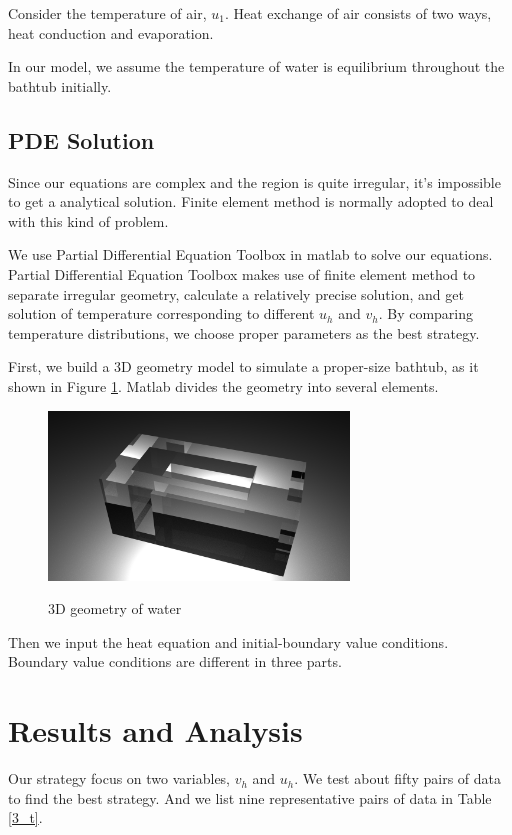 \documentclass[12pt,a4paper,titlepage]{article}
\begin{document}
Consider the temperature of air, $u_1$. Heat exchange of air consists of two ways, heat conduction and evaporation.

In our model, we assume the temperature of water is equilibrium throughout the bathtub initially.

\subsection{PDE Solution}
\label{sec:PDE solution}
Since our equations are complex and the region is quite irregular, it's impossible to get a analytical solution. Finite element method is normally adopted to deal with this kind of problem.

We use Partial Differential Equation Toolbox in matlab to solve our equations. Partial Differential Equation Toolbox makes use of finite element method to separate irregular geometry, calculate a relatively precise solution, and get solution of temperature corresponding to different $u_h$ and $v_h$. By comparing temperature distributions, we choose proper parameters as the best strategy.

First, we build a 3D geometry model to simulate a proper-size bathtub, as it shown in Figure \ref{4_p}. Matlab divides the geometry into several elements.
\begin{figure}[htb]
  \centering
  \includegraphics[width=8cm]{4.png}\\
  \caption{3D geometry of water}\label{4_p}
\end{figure}

Then we input the heat equation and initial-boundary value conditions. Boundary value conditions are different in three parts.

\section{Results and Analysis}
\label{sec:performance-and-analysis}

Our strategy focus on two variables, $v_h$ and $u_h$. We test about fifty pairs of data to find the best strategy. And we list nine representative pairs of data in Table \ref{3_t}.
\end{document}
